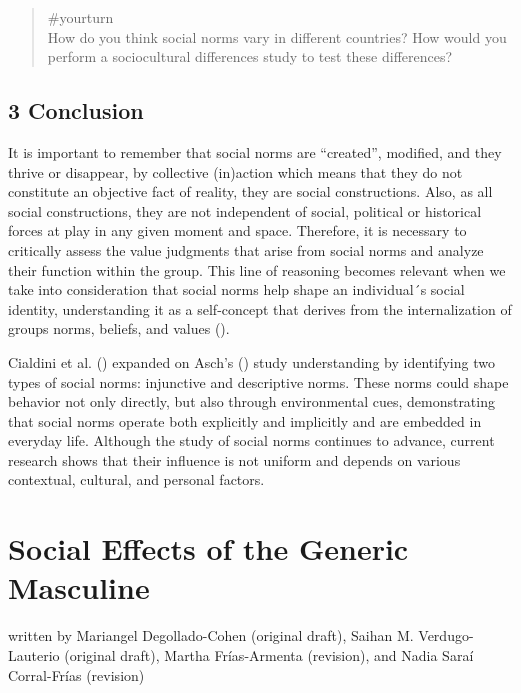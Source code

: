 \documentclass[
  letterpaper,
]{book}
\begin{document}
\begin{quote}
{\#yourturn}\\
How do you think social norms vary in different countries? How would you
perform a sociocultural differences study to test these differences?
\end{quote}

\section{3 Conclusion}\label{conclusion-14}

It is important to remember that social norms are ``created'', modified,
and they thrive or disappear, by collective (in)action which means that
they do not constitute an objective fact of reality, they are social
constructions. Also, as all social constructions, they are not
independent of social, political or historical forces at play in any
given moment and space. Therefore, it is necessary to critically assess
the value judgments that arise from social norms and analyze their
function within the group. This line of reasoning becomes relevant when
we take into consideration that social norms help shape an individual´s
social identity, understanding it as a self-concept that derives from
the internalization of groups norms, beliefs, and values
().

Cialdini et al. () expanded on
Asch's () study understanding by
identifying two types of social norms: injunctive and descriptive norms.
These norms could shape behavior not only directly, but also through
environmental cues, demonstrating that social norms operate both
explicitly and implicitly and are embedded in everyday life. Although
the study of social norms continues to advance, current research shows
that their influence is not uniform and depends on various contextual,
cultural, and personal factors.


\chapter{\texorpdfstring{{Social Effects of the Generic
Masculine}}{Social Effects of the Generic Masculine}}\label{social-effects-of-the-generic-masculine}

{written by Mariangel Degollado-Cohen (original draft), Saihan M.
Verdugo-Lauterio (original draft), Martha Frías-Armenta (revision), and
Nadia Saraí Corral-Frías (revision)}
\end{document}
